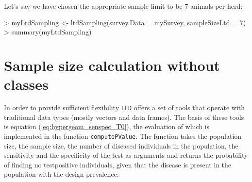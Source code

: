 \documentclass[nojss]{jss}
\begin{document}
Let's say we have chosen the appropriate sample limit to be 7 
animals per herd: 
  
\begin{Schunk}
\begin{Sinput}
> myLtdSampling <- ltdSampling(survey.Data = mySurvey, 
       sampleSizeLtd = 7)
> summary(myLtdSampling) 
\end{Sinput}
\end{Schunk}


%
%

\section{Sample size calculation without classes}
\label{sec:using-ffd-noclass}

In order to provide sufficient flexibility \texttt{FFD} offers a set 
of tools that operate with traditional data types (mostly vectors 
and data frames). The basis of these tools is equation 
(\ref{eq:hypergeom_senspec_T0}), the evaluation of which is 
implemented in the function \texttt{computePValue}. 
 The function takes the population 
size, the sample size, the number of diseased individuals in the 
population, the sensitivity and the specificity of the test as 
arguments and returns the probability of finding no testpositive 
individuals, given that the disease is present in the population 
with the design prevalence: 
\end{document}

